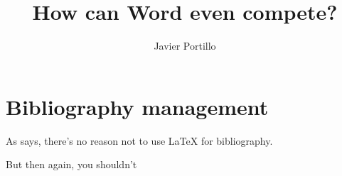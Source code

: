 \documentclass{article}
\author{Javier Portillo}
\title{How can Word even compete?}
\begin{document}
\maketitle

\section{Bibliography management}

As \textcite{javi22} says, there's no reason not to use {\LaTeX} for bibliography.

But then again, you shouldn't \parencite{beki23}

\printbibliography
\end{document}
